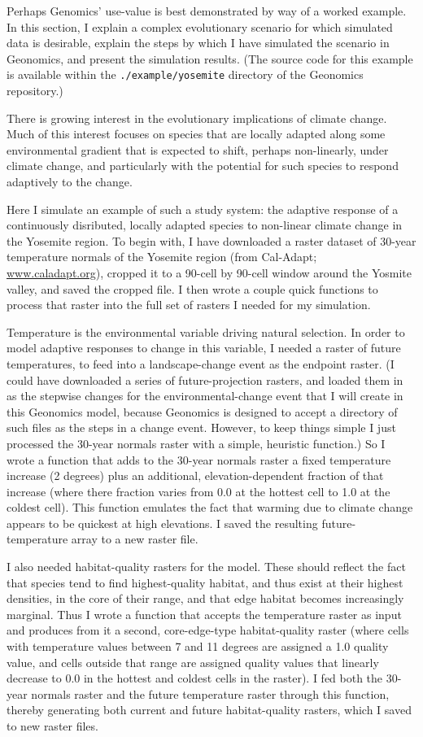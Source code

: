 ﻿\documentclass{article}
\begin{document}
Perhaps Genomics' use-value is best demonstrated by way of a worked example.
In this section, I explain a complex evolutionary scenario for which 
simulated data is desirable, explain the steps by which I have simulated the
scenario in Geonomics, and present the simulation results. (The source code for
this example is available within the \texttt{./example/yosemite} directory
of the Geonomics repository.)

There is growing interest in the evolutionary implications of climate change.
Much of this interest focuses on species that are locally adapted along some
environmental gradient that is expected to shift, perhaps non-linearly,
under climate change, and particularly with the potential for such species
to respond adaptively to the change.

Here I simulate an example of such a study system: the adaptive
response of a continuously disributed, locally adapted species
to non-linear climate change in the Yosemite region. To begin with, I have
downloaded a raster dataset of 30-year temperature normals of the Yosemite
region (from Cal-Adapt; \url{www.caladapt.org}), cropped it to a 90-cell by
90-cell window around the Yosmite valley, and saved the cropped file. I then
wrote a couple quick functions to process that raster into the full set of
rasters I needed for my simulation.

Temperature is the environmental variable driving natural selection.
In order to model adaptive responses to change in this variable, I needed
a raster of future temperatures, to feed into a landscape-change event
as the endpoint raster.
(I could have downloaded a series of future-projection rasters, and loaded
them in as the stepwise changes for the environmental-change event that I will
create in this Geonomics model, because Geonomics is designed to accept a
directory of such files as the steps in a change event. However, to keep
things simple I just processed the 30-year normals raster with a simple,
heuristic function.) So I wrote a function that adds to the 30-year normals
raster a fixed temperature increase (2 degrees) plus an additional,
elevation-dependent fraction of that increase (where there fraction varies
from 0.0 at the hottest cell to 1.0 at the coldest cell). This function
emulates the fact that warming due to climate change appears to be quickest
at high elevations. I saved the resulting future-temperature array to a new
raster file.

I also needed habitat-quality rasters for the model. These should reflect
the fact that species tend to find highest-quality habitat, and thus exist at
their highest densities, in the core of their range, and that edge habitat
becomes increasingly marginal. Thus I wrote a function that accepts the
temperature raster as input and produces from
it a second, core-edge-type habitat-quality raster (where cells with
temperature values between 7 and 11 degrees are assigned a 1.0 quality value,
and cells outside that range are assigned quality values that linearly decrease
to 0.0 in the hottest and coldest cells in the raster). I fed both the 30-year
normals raster and the future temperature raster through this function, thereby
generating both current and future habitat-quality rasters, which I saved to
new raster files.
\end{document}
